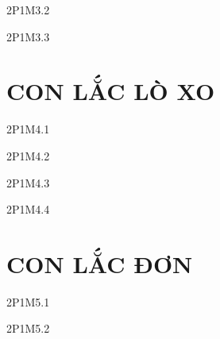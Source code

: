 \documentclass[
tuychon=HS1,
pagesize=BookA4,%
company=MAP, %
mausac = 01,
]{Class/MAPClass}
\begin{document}
\setcounter{vidu}{0}

\Btvandung
\begin{cauhoiTN}{2P1M3.2}

\end{cauhoiTN}
%

\setcounter{vidu}{0}
 
\Btvandung
\begin{cauhoiTN}{2P1M3.3}

\end{cauhoiTN}
%

\setcounter{vidu}{0}

%
%
\clearpage

\section{CON LẮC LÒ XO}


\begin{cauhoiTN}{2P1M4.1}

\end{cauhoiTN}


\setcounter{vidu}{0}

\Btvandung
\begin{cauhoiTN}{2P1M4.2}
	
\end{cauhoiTN}
%

\setcounter{vidu}{0}

\Btvandung
\begin{cauhoiTN}{2P1M4.3}

\end{cauhoiTN}
%
\setcounter{vidu}{0}

\Btvandung
\begin{cauhoiTN}{2P1M4.4}

\end{cauhoiTN}
%
\clearpage
\section{CON LẮC ĐƠN}

\begin{cauhoiTN}{2P1M5.1}

\end{cauhoiTN}
%
\setcounter{vidu}{0}

\Btvandung
\begin{cauhoiTN}{2P1M5.2}

\end{cauhoiTN}
%
\clearpage
\end{document}
